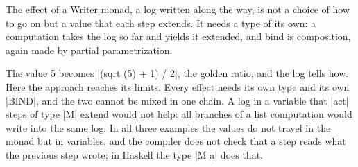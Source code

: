 The effect of a Writer monad, a log written along the way, is not a
choice of how to go on but a value that each step extends. It needs a
type of its own: a computation takes the log so far and yields it
extended, and bind is composition, again made by partial
parametrization:


\noindent The value 5 becomes \code|(sqrt (5) + 1) / 2|, the golden
ratio, and the log tells how. Here the approach reaches its limits. Every effect
needs its own type and its own \code|BIND|, and the two cannot be mixed in
one chain. A log in a variable that \code|act| steps of type \code|M|
extend would not help: all branches of a list computation would write
into the same log. In all three examples the values do not travel in the
monad but in variables, and the compiler does not check that a step reads
what the previous step wrote; in Haskell the type \code|M a| does that.
